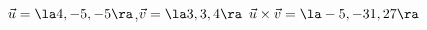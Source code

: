 {$\vec u = \la 4,-5,-5\ra$,\quad $\vec v = \la 3,3,4\ra$
}
{$\vec u\times\vec v = \la -5,-31,27\ra$
}
